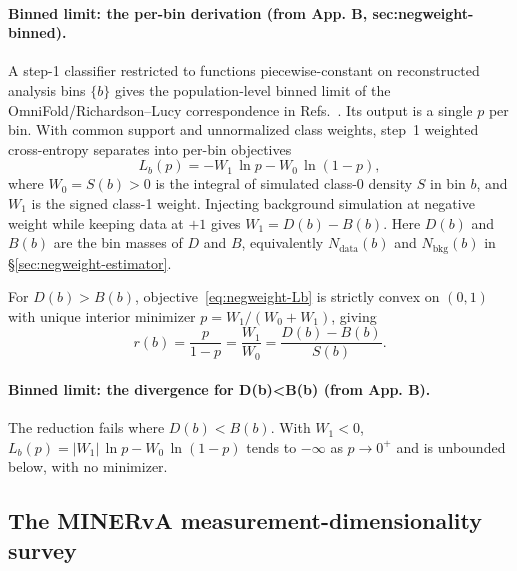 \paragraph{Binned limit: the per-bin derivation (from App. B, sec:negweight-binned).} A step-1 classifier restricted to functions piecewise-constant on reconstructed analysis bins $\{b\}$ gives the population-level binned limit of the OmniFold/Richardson--Lucy correspondence in Refs.~\cite{Andreassen:2019cjw,Andreassen:2021zzk}. Its output is a single $p$ per bin. With common support and unnormalized class weights, step~1 weighted cross-entropy separates into per-bin objectives
\begin{equation}
  \label{eq:negweight-Lb}
  L_b(p) = -W_1\,\ln p - W_0\,\ln(1-p),
\end{equation}
where $W_0=S(b)>0$ is the integral of simulated class-0 density $S$ in bin $b$, and $W_1$ is the signed class-1 weight. Injecting background simulation at negative weight while keeping data at $+1$ gives $W_1=D(b)-B(b)$. Here $D(b)$ and $B(b)$ are the bin masses of $D$ and $B$, equivalently $N_{\mathrm{data}}(b)$ and $N_{\mathrm{bkg}}(b)$ in \S\ref{sec:negweight-estimator}.

For $D(b)>B(b)$, objective~\eqref{eq:negweight-Lb} is strictly convex on $(0,1)$ with unique interior minimizer $p=W_1/(W_0+W_1)$, giving
\begin{equation}
  r(b) = \frac{p}{1-p} = \frac{W_1}{W_0} = \frac{D(b)-B(b)}{S(b)}.
\end{equation}

\paragraph{Binned limit: the divergence for D(b)<B(b) (from App. B).} The reduction fails where $D(b)<B(b)$. With $W_1<0$, $L_b(p)=|W_1|\,\ln p-W_0\,\ln(1-p)$ tends to $-\infty$ as $p\to0^+$ and is unbounded below, with no minimizer.

\subsection{The MINERvA measurement-dimensionality survey}
\label{app:landscape}

